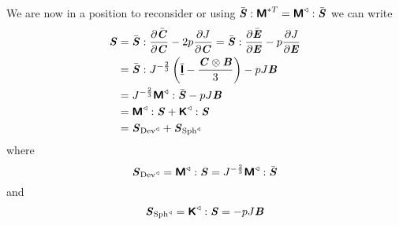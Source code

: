 We are now in a position to reconsider
 or
 \ie using
$ \bar{\boldsymbol{\mathit{S}}} : \boldsymbol{\mathsf{M}}^{*T} =  \boldsymbol{\mathsf{M}}^{\triangleleft}  : \bar{\boldsymbol{\mathit{S}}} $
we can write
\begin{equation}
  \begin{split}
    \boldsymbol{\mathit{S}}&= \bar{\boldsymbol{\mathit{S}}} :  \dfrac{\partial \bar{\boldsymbol{\mathit{C}}}}{\partial \boldsymbol{\mathit{C}}}  -2p \dfrac{\partial J}{\partial \boldsymbol{\mathit{C}}} =
     \bar{\boldsymbol{\mathit{S}}} :  \dfrac{\partial \bar{\boldsymbol{\mathit{E}}}}{\partial \boldsymbol{\mathit{E}}}  -p \dfrac{\partial J}{\partial \boldsymbol{\mathit{E}}} \\
    &=
     \bar{\boldsymbol{\mathit{S}}} :  J^{-\frac{2}{3}}\left(   \overline{\underline{\boldsymbol{\mathsf{ I }}}}  -\dfrac{ \boldsymbol{\mathit{C}} \otimes \boldsymbol{\mathit{B}} }{3} \right) -pJ\boldsymbol{\mathit{B}}\\
    &=J^{-\frac{2}{3}}  \boldsymbol{\mathsf{M}}^{\triangleleft}  : \bar{\boldsymbol{\mathit{S}}} -pJ\boldsymbol{\mathit{B}}\\
    &=  \boldsymbol{\mathsf{M}}^{\triangleleft}  : \boldsymbol{\mathit{S}} +  \boldsymbol{\mathsf{K}}^{\triangleleft}  : \boldsymbol{\mathit{S}} \\
    &=\boldsymbol{\mathit{S}}_{ \operatorname{Dev}^{\triangleleft} }+\boldsymbol{\mathit{S}}_{ \operatorname{Sph}^{\triangleleft} }
  \end{split}
\end{equation}
where
\begin{equation}
  \boldsymbol{\mathit{S}}_{ \operatorname{Dev}^{\triangleleft} }=  \boldsymbol{\mathsf{M}}^{\triangleleft}  : \boldsymbol{\mathit{S}} =J^{-\frac{2}{3}}  \boldsymbol{\mathsf{M}}^{\triangleleft}  : \bar{\boldsymbol{\mathit{S}}} 
\end{equation}
and
\begin{equation}
  \boldsymbol{\mathit{S}}_{ \operatorname{Sph}^{\triangleleft} }=  \boldsymbol{\mathsf{K}}^{\triangleleft}  : \boldsymbol{\mathit{S}} =-pJ\boldsymbol{\mathit{B}}
\end{equation}

